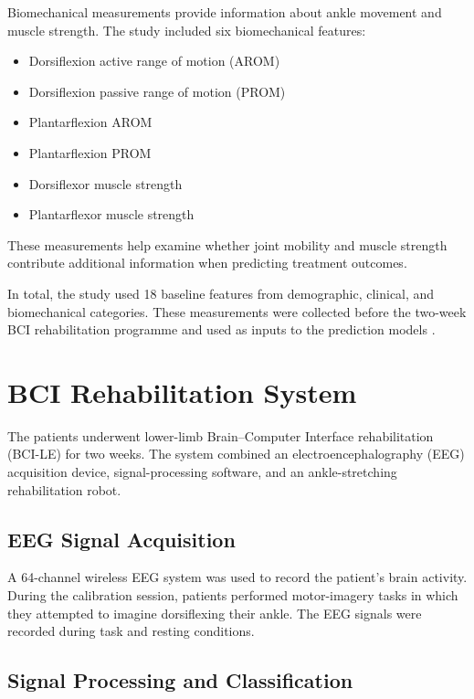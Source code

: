 Biomechanical measurements provide information about ankle movement and muscle strength. The study included six biomechanical features:

\begin{itemize}
    \item Dorsiflexion active range of motion (AROM)
    \item Dorsiflexion passive range of motion (PROM)
    \item Plantarflexion AROM
    \item Plantarflexion PROM
    \item Dorsiflexor muscle strength
    \item Plantarflexor muscle strength
\end{itemize}

These measurements help examine whether joint mobility and muscle strength contribute additional information when predicting treatment outcomes.

In total, the study used 18 baseline features from demographic, clinical, and biomechanical categories. These measurements were collected before the two-week BCI rehabilitation programme and used as inputs to the prediction models \cite{bib1}.

\section{{BCI Rehabilitation System}}

The patients underwent lower-limb Brain--Computer Interface rehabilitation (BCI-LE) for two weeks. The system combined an electroencephalography (EEG) acquisition device, signal-processing software, and an ankle-stretching rehabilitation robot.

\subsection{{EEG Signal Acquisition}}

A 64-channel wireless EEG system was used to record the patient's brain activity. During the calibration session, patients performed motor-imagery tasks in which they attempted to imagine dorsiflexing their ankle. The EEG signals were recorded during task and resting conditions.

\subsection{{Signal Processing and Classification}}

